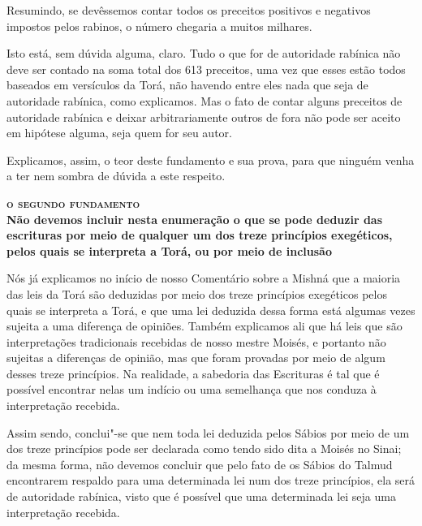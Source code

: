 Resumindo, se devêssemos contar todos os preceitos positivos e
negativos impostos pelos rabinos, o número chegaria a muitos milhares.

Isto está, sem dúvida alguma, claro. Tudo o que for de autoridade
rabínica não deve ser contado na soma total dos 613 preceitos, uma vez
que esses estão todos baseados em versículos da Torá\starr, não havendo entre
eles nada que seja de autoridade rabínica, como explicamos. Mas o fato
de contar alguns preceitos de autoridade rabínica e deixar
arbitrariamente outros de fora não pode ser aceito em hipótese alguma,
seja quem for seu autor.

Explicamos, assim, o teor deste fundamento e sua prova, para que ninguém
venha a ter nem sombra de dúvida a este respeito.


\bigskip

\noindent\textbf{\textsc{o segundo fundamento}\\Não devemos incluir nesta enumeração o que se pode deduzir das escrituras por meio de qualquer um dos treze princípios exegéticos, pelos quais se interpreta a Torá\starr, ou por meio de inclusão}

\smallskip

Nós já explicamos no início de nosso Comentário sobre a Mishná\starr{}
que a maioria das leis da Torá\starr{} são deduzidas por meio dos treze
princípios exegéticos pelos quais se interpreta a Torá\starr, e que uma lei
deduzida dessa forma está algumas vezes sujeita a uma diferença de
opiniões. Também explicamos ali que há leis que são interpretações
tradicionais recebidas de nosso mestre Moisés, e portanto não sujeitas
a diferenças de opinião, mas que foram provadas por meio de algum
desses treze princípios. Na realidade, a sabedoria das Escrituras é tal
que é possível encontrar nelas um indício ou uma semelhança que nos
conduza à interpretação recebida.

Assim sendo, conclui"-se que nem toda lei deduzida pelos Sábios por meio
de um dos treze princípios pode ser declarada como tendo sido dita a
Moisés no Sinai; da mesma forma, não devemos concluir que pelo fato de
os Sábios do Talmud\starr{} encontrarem respaldo para uma determinada lei num
dos treze princípios, ela será de autoridade rabínica, visto que é
possível que uma
determinada lei seja uma interpretação recebida.

